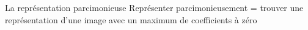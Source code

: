 \begin{frame}{La représentation parcimonieuse}
Représenter parcimonieusement = trouver une représentation d'une image avec un maximum de \alert{coefficients à zéro}
\begin{figure}\centering
{}
\end{figure}
\end{frame}


